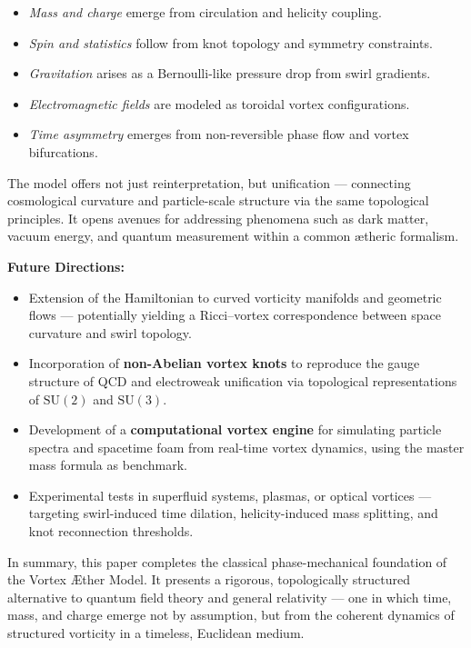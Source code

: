 \documentclass[preprint]{revtex4-2}
\begin{document}
\begin{itemize}
    \item \emph{Mass and charge} emerge from circulation and helicity coupling.
    \item \emph{Spin and statistics} follow from knot topology and symmetry constraints.
    \item \emph{Gravitation} arises as a Bernoulli-like pressure drop from swirl gradients.
    \item \emph{Electromagnetic fields} are modeled as toroidal vortex configurations.
    \item \emph{Time asymmetry} emerges from non-reversible phase flow and vortex bifurcations.
\end{itemize}

The model offers not just reinterpretation, but unification — connecting cosmological curvature and particle-scale structure via the same topological principles. It opens avenues for addressing phenomena such as dark matter, vacuum energy, and quantum measurement within a common ætheric formalism.

\vspace{0.5em}
\noindent
\textbf{Future Directions:}
\begin{itemize}
    \item Extension of the Hamiltonian to curved vorticity manifolds and geometric flows — potentially yielding a Ricci–vortex correspondence between space curvature and swirl topology.

    \item Incorporation of \textbf{non-Abelian vortex knots} to reproduce the gauge structure of QCD and electroweak unification via topological representations of $\mathrm{SU}(2)$ and $\mathrm{SU}(3)$.

    \item Development of a \textbf{computational vortex engine} for simulating particle spectra and spacetime foam from real-time vortex dynamics, using the master mass formula as benchmark.

    \item Experimental tests in superfluid systems, plasmas, or optical vortices — targeting swirl-induced time dilation, helicity-induced mass splitting, and knot reconnection thresholds.
\end{itemize}

\vspace{1em}
In summary, this paper completes the classical phase-mechanical foundation of the Vortex \AE{}ther Model. It presents a rigorous, topologically structured alternative to quantum field theory and general relativity — one in which time, mass, and charge emerge not by assumption, but from the coherent dynamics of structured vorticity in a timeless, Euclidean medium.
\end{document}
